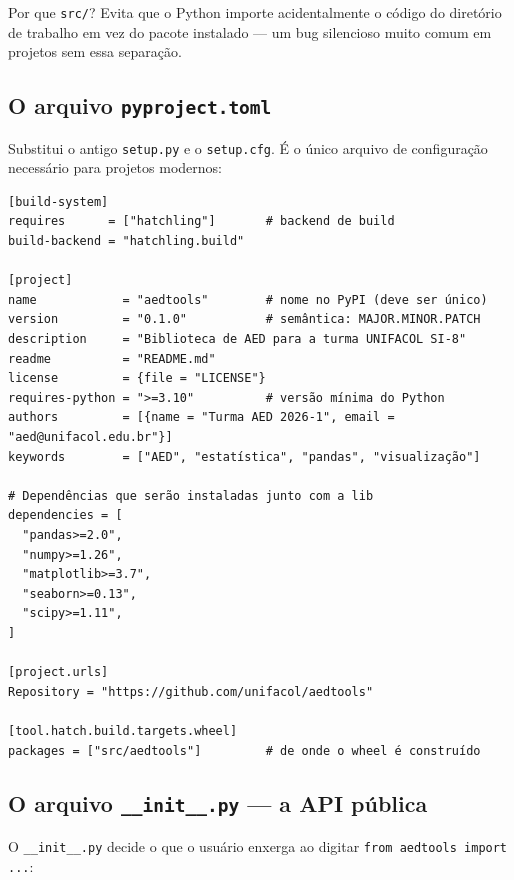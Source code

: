 \begin{NoteBox}
Por que \texttt{src/}? Evita que o Python importe acidentalmente o código
do diretório de trabalho em vez do pacote instalado — um bug silencioso
muito comum em projetos sem essa separação.
\end{NoteBox}

\subsection*{O arquivo \texttt{pyproject.toml}}

Substitui o antigo \texttt{setup.py} e o \texttt{setup.cfg}. É o único
arquivo de configuração necessário para projetos modernos:

\begin{lstlisting}[language={}]
[build-system]
requires      = ["hatchling"]       # backend de build
build-backend = "hatchling.build"

[project]
name            = "aedtools"        # nome no PyPI (deve ser único)
version         = "0.1.0"           # semântica: MAJOR.MINOR.PATCH
description     = "Biblioteca de AED para a turma UNIFACOL SI-8"
readme          = "README.md"
license         = {file = "LICENSE"}
requires-python = ">=3.10"          # versão mínima do Python
authors         = [{name = "Turma AED 2026-1", email = "aed@unifacol.edu.br"}]
keywords        = ["AED", "estatística", "pandas", "visualização"]

# Dependências que serão instaladas junto com a lib
dependencies = [
  "pandas>=2.0",
  "numpy>=1.26",
  "matplotlib>=3.7",
  "seaborn>=0.13",
  "scipy>=1.11",
]

[project.urls]
Repository = "https://github.com/unifacol/aedtools"

[tool.hatch.build.targets.wheel]
packages = ["src/aedtools"]         # de onde o wheel é construído
\end{lstlisting}

\subsection*{O arquivo \texttt{\_\_init\_\_.py} — a API pública}

O \texttt{\_\_init\_\_.py} decide o que o usuário enxerga ao digitar
\texttt{from aedtools import ...}:

